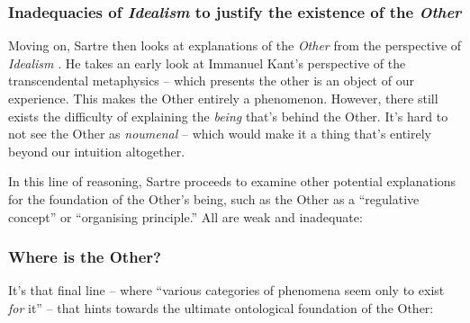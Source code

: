 \subsubsection{Inadequacies of \emph{Idealism} to justify the existence of the \emph{Other}}

Moving on, Sartre then looks at explanations of the \emph{Other} from the perspective of \emph{Idealism} \autocite[312]{sartre}. He takes an early look at Immanuel Kant's perspective of the transcendental metaphysics -- which presents the other is an object of our experience. This makes the Other entirely a phenomenon. However, there still exists the difficulty of explaining the \emph{being} that's behind the Other. It's hard to not see the Other as \emph{noumenal} -- which would make it a thing that's entirely beyond our intuition altogether.

In this line of reasoning, Sartre proceeds to examine other \autocite[315]{sartre} potential explanations for the foundation of the Other's being, such as the Other as a \enquote{regulative concept} or \enquote{organising principle.} All are weak and inadequate:


\subsubsection{Where is the Other?}

It's that final line -- where \enquote{various categories of phenomena seem only to exist \emph{for} it} -- that hints towards the ultimate ontological foundation of the Other:

